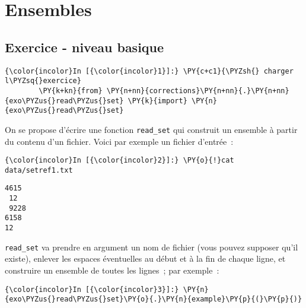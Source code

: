     
    
    
    

    

    \hypertarget{ensembles}{%
\section{Ensembles}\label{ensembles}}

    \hypertarget{exercice---niveau-basique}{%
\subsection{Exercice - niveau basique}\label{exercice---niveau-basique}}

    \begin{Verbatim}[commandchars=\\\{\},frame=single,framerule=0.3mm,rulecolor=\color{cellframecolor}]
{\color{incolor}In [{\color{incolor}1}]:} \PY{c+c1}{\PYZsh{} charger l\PYZsq{}exercice}
        \PY{k+kn}{from} \PY{n+nn}{corrections}\PY{n+nn}{.}\PY{n+nn}{exo\PYZus{}read\PYZus{}set} \PY{k}{import} \PY{n}{exo\PYZus{}read\PYZus{}set}
\end{Verbatim}


    On se propose d'écrire une fonction \texttt{read\_set} qui construit un
ensemble à partir du contenu d'un fichier. Voici par exemple un fichier
d'entrée~:

    \begin{Verbatim}[commandchars=\\\{\},frame=single,framerule=0.3mm,rulecolor=\color{cellframecolor}]
{\color{incolor}In [{\color{incolor}2}]:} \PY{o}{!}cat data/setref1.txt
\end{Verbatim}


    \begin{Verbatim}[commandchars=\\\{\},frame=single,framerule=0.3mm,rulecolor=\color{cellframecolor}]
4615
 12
 9228
6158
12
\end{Verbatim}

    \texttt{read\_set} va prendre en argument un nom de fichier (vous pouvez
supposer qu'il existe), enlever les espaces éventuelles au début et à la
fin de chaque ligne, et construire un ensemble de toutes les lignes~;
par exemple~:

    \begin{Verbatim}[commandchars=\\\{\},frame=single,framerule=0.3mm,rulecolor=\color{cellframecolor}]
{\color{incolor}In [{\color{incolor}3}]:} \PY{n}{exo\PYZus{}read\PYZus{}set}\PY{o}{.}\PY{n}{example}\PY{p}{(}\PY{p}{)}
\end{Verbatim}


